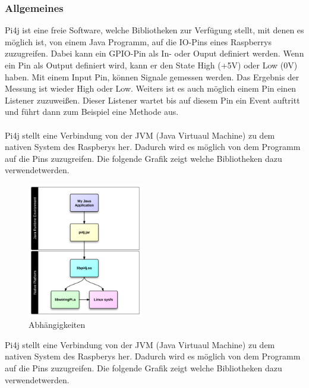 \subsubsection{Allgemeines}
Pi4j ist eine freie Software, welche Bibliotheken zur Verfügung stellt, mit denen es möglich ist, von einem Java Programm, auf die IO-Pins eines Raspberrys zuzugreifen. Dabei kann ein GPIO-Pin als In- oder Ouput definiert werden. Wenn ein Pin als Output definiert wird, kann er den State High (+5V) oder Low (0V) haben. Mit einem Input Pin, können Signale gemessen werden. Das Ergebnis der Messung ist wieder High oder Low. Weiters ist es auch möglich einem Pin einen Listener zuzuweißen. Dieser Listener wartet bis auf diesem Pin ein Event auftritt und führt dann zum Beispiel eine Methode aus. 
\\ \\
Pi4j stellt eine Verbindung von der JVM (Java Virtuaul Machine) zu dem nativen System des Raspberys her. Dadurch wird es möglich von dem Programm auf die Pins zuzugreifen. Die folgende Grafik zeigt welche Bibliotheken dazu verwendetwerden.

\begin{figure}
\vspace{-35pt}
  \begin{center}
    \includegraphics[width=0.45\textwidth]{Bilder/pi4j/dependencies}
  \end{center}
  \caption{Abhängigkeiten}
  \label{Magazin Vorne}
  \vspace{-170pt}
\end{figure}

Pi4j stellt eine Verbindung von der JVM (Java Virtuaul Machine) zu dem nativen System des Raspberys her. Dadurch wird es möglich von dem Programm auf die Pins zuzugreifen. Die folgende Grafik zeigt welche Bibliotheken dazu verwendetwerden.

